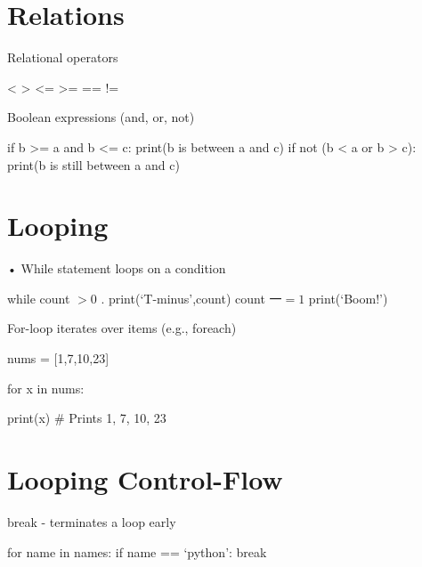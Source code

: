 \documentclass[
  letterpaper,
  DIV=11,
  numbers=noendperiod]{scrreprt}
\newenvironment{Shaded}{\begin{snugshade}}{\end{snugshade}}
\newcommand{\ErrorTok}[1]{\textcolor[rgb]{0.68,0.00,0.00}{#1}}
\newcommand{\NormalTok}[1]{\textcolor[rgb]{0.00,0.23,0.31}{#1}}
\begin{document}

\chapter{Relations}\label{relations}

Relational operators

\begin{Shaded}
\begin{Highlighting}[]
\ErrorTok{\textless{}}\NormalTok{ \textgreater{} }\ErrorTok{\textless{}}\NormalTok{= \textgreater{}= == != }
\end{Highlighting}
\end{Shaded}

Boolean expressions (and, or, not)

\begin{Shaded}
\begin{Highlighting}[]
\NormalTok{if b \textgreater{}= a and b \textless{}= c: print(\textquotesingle{}b is between a and c\textquotesingle{})  }
\NormalTok{if not (b \textless{} a or b \textgreater{} c): print(\textquotesingle{}b is still between a and c\textquotesingle{}) }
\end{Highlighting}
\end{Shaded}


\chapter{Looping}\label{looping}

• While statement loops on a condition

while count \(>0\) . print(`T-minus',count) count \(\text{一} = 1\)
print(`Boom!')

For-loop iterates over items (e.g., foreach)

nums = {[}1,7,10,23{]}

for x in nums:

print(x) \# Prints 1, 7, 10, 23


\chapter{Looping Control-Flow}\label{looping-control-flow}

break - terminates a loop early

for name in names: if name == `python': break
\end{document}

